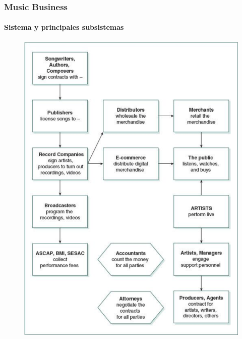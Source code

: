 \documentclass[xcolor=table]{beamer}
\begin{document}
	\begin{frame}
		\frametitle{Music Business}
		\framesubtitle{Sistema y principales subsistemas~\cite{baskerville2006music}}
		\begin{figure}
    			\centering
    			\includegraphics[scale=0.25]{images/musicbusiness.png}
			\label{fig:1}
    		\end{figure}
	\end{frame}
\end{document}
